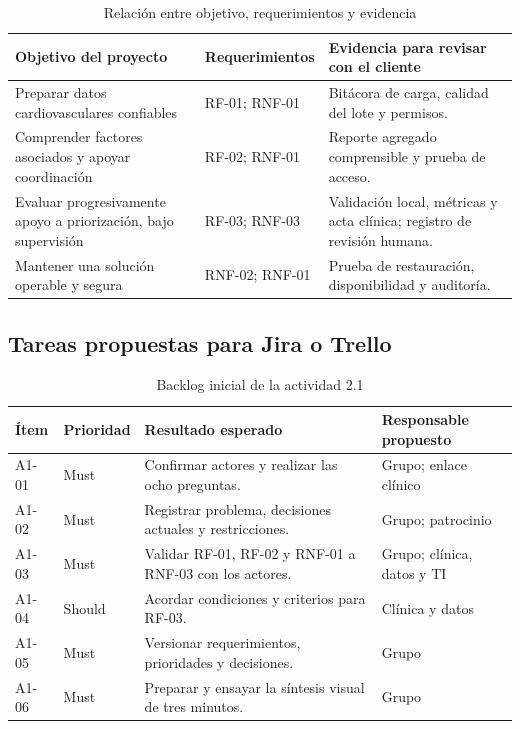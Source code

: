 \documentclass[12pt,a4paper]{article}
\begin{document}
\begin{table}[H]
  \centering
  \caption{Relación entre objetivo, requerimientos y evidencia}
  \label{tab:act1-trazabilidad}
  \small
  \begin{tabularx}{\textwidth}{@{}XXX@{}}
    \toprule
    Objetivo del proyecto & Requerimientos & Evidencia para revisar con el cliente \\
    \midrule
    Preparar datos cardiovasculares confiables & RF-01; RNF-01 & Bitácora de carga, calidad del lote y permisos. \\
    Comprender factores asociados y apoyar coordinación & RF-02; RNF-01 & Reporte agregado comprensible y prueba de acceso. \\
    Evaluar progresivamente apoyo a priorización, bajo supervisión & RF-03; RNF-03 & Validación local, métricas y acta clínica; registro de revisión humana. \\
    Mantener una solución operable y segura & RNF-02; RNF-01 & Prueba de restauración, disponibilidad y auditoría. \\
    \bottomrule
  \end{tabularx}
\end{table}

\subsection{Tareas propuestas para Jira o Trello}

\begin{table}[H]
  \centering
  \caption{Backlog inicial de la actividad 2.1}
  \label{tab:act1-backlog}
  \small
  \begin{tabularx}{\textwidth}{@{}llXl@{}}
    \toprule
    Ítem & Prioridad & Resultado esperado & Responsable propuesto \\
    \midrule
    A1-01 & Must & Confirmar actores y realizar las ocho preguntas. & Grupo; enlace clínico \\
    A1-02 & Must & Registrar problema, decisiones actuales y restricciones. & Grupo; patrocinio \\
    A1-03 & Must & Validar RF-01, RF-02 y RNF-01 a RNF-03 con los actores. & Grupo; clínica, datos y TI \\
    A1-04 & Should & Acordar condiciones y criterios para RF-03. & Clínica y datos \\
    A1-05 & Must & Versionar requerimientos, prioridades y decisiones. & Grupo \\
    A1-06 & Must & Preparar y ensayar la síntesis visual de tres minutos. & Grupo \\
    \bottomrule
  \end{tabularx}
\end{table}
\end{document}
